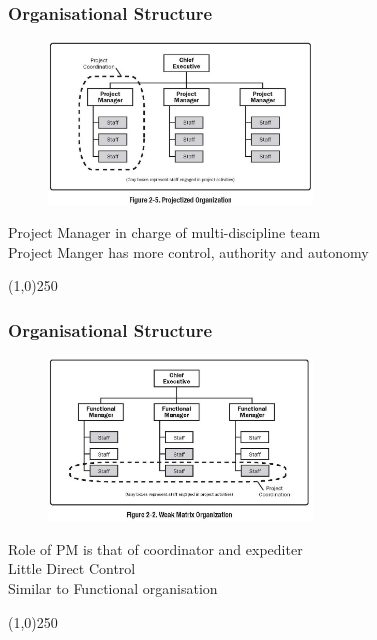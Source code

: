 \begin{frame}
\frametitle{Organisational Structure}
\begin{figure}
	\centering
		\includegraphics[width = 7cm]{images/Fig2-5.jpg}
	\label{fig:2-5}
\end{figure}Project Manager in charge of multi-discipline team\\
Project Manger has more control, authority and autonomy\\
\end{frame}
\begin{center}\line(1,0){250}\end{center}



\begin{frame}
\frametitle{Organisational Structure}
\begin{figure}
	\centering
		\includegraphics[width = 7cm]{images/Fig2-2.jpg}
	\label{fig:2-2}
\end{figure}Role of PM is that of coordinator and expediter\\
Little Direct Control\\
Similar to Functional organisation\\
\end{frame}
\begin{center}\line(1,0){250}\end{center}



